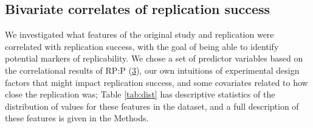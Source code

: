 \documentclass[
  english,
  a4paper,
]{article}
\begin{document}
\hypertarget{bivariate-correlates-of-replication-success}{%
\subsection{Bivariate correlates of replication success}\label{bivariate-correlates-of-replication-success}}

We investigated what features of the original study and replication were correlated with replication success, with the goal of being able to identify potential markers of replicability. We chose a set of predictor variables based on the correlational results of RP:P (\protect\hyperlink{ref-openscienceconsortium2015}{3}), our own intuitions of experimental design factors that might impact replication success, and some covariates related to how close the replication was; Table \ref{tab:dist} has descriptive statistics of the distribution of values for these features in the dataset, and a full description of these features is given in the Methods.
\end{document}
